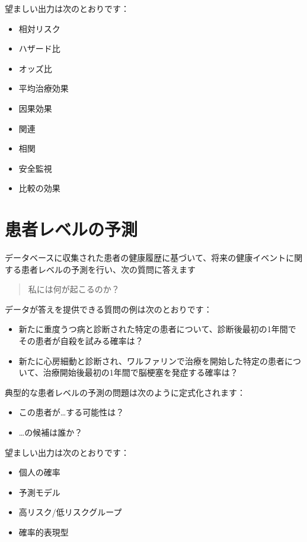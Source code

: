 \documentclass[
  11pt]{book}
\providecommand{\tightlist}{%
  \setlength{\itemsep}{0pt}\setlength{\parskip}{0pt}}
\theoremstyle{definition}
\theoremstyle{definition}
\theoremstyle{definition}
\theoremstyle{definition}
\theoremstyle{remark}
\begin{document}
望ましい出力は次のとおりです：

\begin{itemize}
\tightlist
\item
  相対リスク
\item
  ハザード比
\item
  オッズ比
\item
  平均治療効果
\item
  因果効果
\item
  関連
\item
  相関
\item
  安全監視
\item
  比較の効果
\end{itemize}

\section{患者レベルの予測}\label{ux60a3ux8005ux30ecux30d9ux30ebux306eux4e88ux6e2c}


データベースに収集された患者の健康履歴に基づいて、将来の健康イベントに関する患者レベルの予測を行い、次の質問に答えます

\begin{quote}
私には何が起こるのか？
\end{quote}

データが答えを提供できる質問の例は次のとおりです：

\begin{itemize}
\tightlist
\item
  新たに重度うつ病と診断された特定の患者について、診断後最初の1年間でその患者が自殺を試みる確率は？
\item
  新たに心房細動と診断され、ワルファリンで治療を開始した特定の患者について、治療開始後最初の1年間で脳梗塞を発症する確率は？
\end{itemize}

典型的な患者レベルの予測の問題は次のように定式化されます：

\begin{itemize}
\tightlist
\item
  この患者が\ldots する可能性は？
\item
  \ldots の候補は誰か？
\end{itemize}

望ましい出力は次のとおりです：

\begin{itemize}
\tightlist
\item
  個人の確率
\item
  予測モデル
\item
  高リスク/低リスクグループ
\item
  確率的表現型
\end{itemize}
\end{document}
